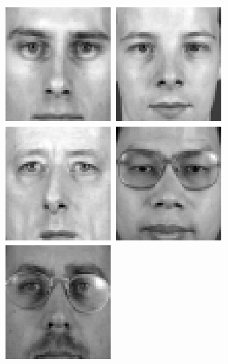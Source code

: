 \begin{figure}
\begin{center}
\includegraphics[scale=0.12]{ch4/figures/XM2VTS_11.png}
\includegraphics[scale=0.12]{ch4/figures/XM2VTS_12.png}
\includegraphics[scale=0.12]{ch4/figures/XM2VTS_13.png}
\includegraphics[scale=0.12]{ch4/figures/XM2VTS_14.png}
\includegraphics[scale=0.12]{ch4/figures/XM2VTS_15.png}

\end{center}
\end{figure}
